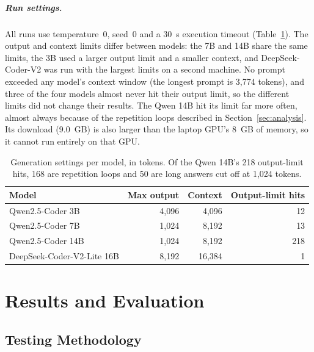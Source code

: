 \paragraph{Run settings.} All runs use temperature~0, seed~0 and a 30~s execution timeout (Table~\ref{tab:settings}). The output and context limits differ between models: the 7B and 14B share the same limits, the 3B used a larger output limit and a smaller context, and DeepSeek-Coder-V2 was run with the largest limits on a second machine. No prompt exceeded any model's context window (the longest prompt is 3,774 tokens), and three of the four models almost never hit their output limit, so the different limits did not change their results. The Qwen 14B hit its limit far more often, almost always because of the repetition loops described in Section~\ref{sec:analysis}. Its download (9.0~GB) is also larger than the laptop GPU's 8~GB of memory, so it cannot run entirely on that GPU.

\begin{table}[!htbp]
\centering
\small
\begin{tabular}{|l|r|r|r|}
\hline
\textbf{Model} & \textbf{Max output} & \textbf{Context} & \textbf{Output-limit hits}\\
\hline
Qwen2.5-Coder 3B & 4,096 & 4,096 & 12\\
Qwen2.5-Coder 7B & 1,024 & 8,192 & 13\\
Qwen2.5-Coder 14B & 1,024 & 8,192 & 218\\
DeepSeek-Coder-V2-Lite 16B & 8,192 & 16,384 & 1\\
\hline
\end{tabular}
\caption{Generation settings per model, in tokens. Of the Qwen 14B's 218 output-limit hits, 168 are repetition loops and 50 are long answers cut off at 1,024 tokens.}
\label{tab:settings}
\end{table}

\chapter{Results and Evaluation}

\section{Testing Methodology}

